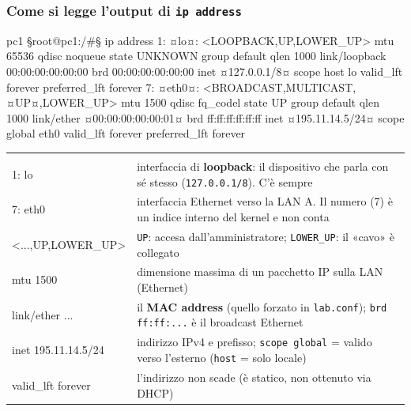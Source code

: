 \subsubsection{Come si legge l'output di \texttt{ip address}}
\begin{terminale}{pc1}
§root@pc1:/#§ ip address
1: ¤lo¤: <LOOPBACK,UP,LOWER_UP> mtu 65536 qdisc noqueue state UNKNOWN group default qlen 1000
    link/loopback 00:00:00:00:00:00 brd 00:00:00:00:00:00
    inet ¤127.0.0.1/8¤ scope host lo
       valid_lft forever preferred_lft forever
7: ¤eth0¤: <BROADCAST,MULTICAST,¤UP¤,LOWER_UP> mtu 1500 qdisc fq_codel state UP group default qlen 1000
    link/ether ¤00:00:00:00:00:01¤ brd ff:ff:ff:ff:ff:ff
    inet ¤195.11.14.5/24¤ scope global eth0
       valid_lft forever preferred_lft forever
\end{terminale}
\begin{center}
\begin{tabularx}{\linewidth}{>{\ttfamily\small}l Y}
 & \\
1: lo & interfaccia di \textbf{loopback}: il dispositivo che parla con sé stesso (\texttt{127.0.0.1/8}). C'è sempre\\
7: eth0 & interfaccia Ethernet verso la LAN A. Il numero (7) è un indice interno del kernel e non conta\\
<...,UP,LOWER\_UP> & \texttt{UP}: accesa dall'amministratore; \texttt{LOWER\_UP}: il «cavo» è collegato\\
mtu 1500 & dimensione massima di un pacchetto IP sulla LAN (Ethernet)\\
link/ether ... & il \textbf{MAC address} (quello forzato in \texttt{lab.conf}); \texttt{brd ff:ff:...} è il broadcast Ethernet\\
inet 195.11.14.5/24 & indirizzo IPv4 e prefisso; \texttt{scope global} = valido verso l'esterno (\texttt{host} = solo locale)\\
valid\_lft forever & l'indirizzo non scade (è statico, non ottenuto via DHCP)\\
\end{tabularx}
\end{center}

